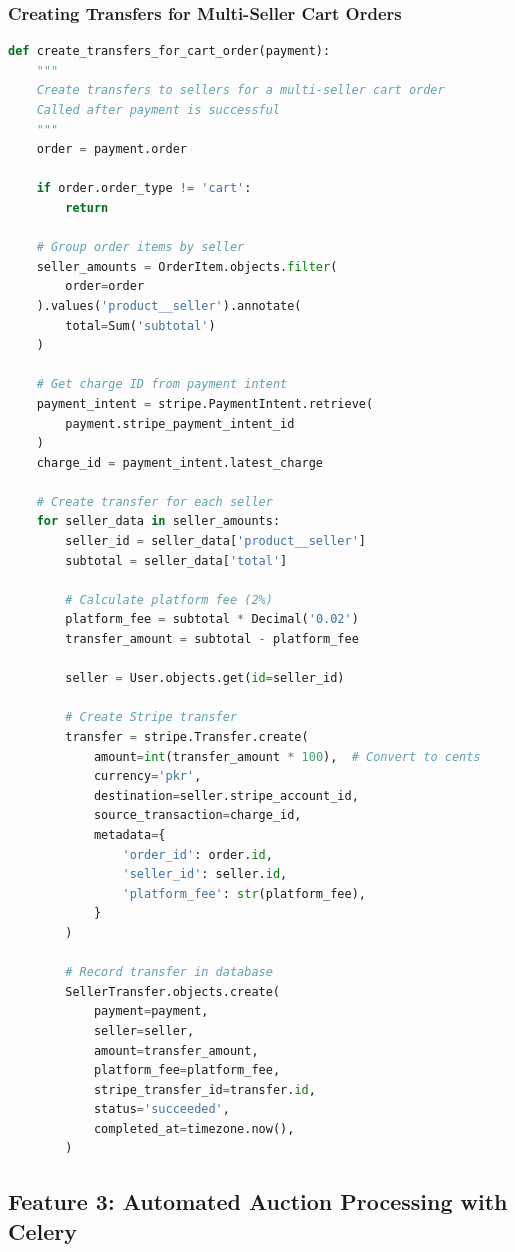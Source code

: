 \documentclass[12pt,a4paper]{article}
\begin{document}
\subsubsection{Creating Transfers for Multi-Seller Cart Orders}
\begin{lstlisting}[language=Python, caption={Automated Seller Transfers (api/stripe\_utils.py)}]
def create_transfers_for_cart_order(payment):
    """
    Create transfers to sellers for a multi-seller cart order
    Called after payment is successful
    """
    order = payment.order
    
    if order.order_type != 'cart':
        return
    
    # Group order items by seller
    seller_amounts = OrderItem.objects.filter(
        order=order
    ).values('product__seller').annotate(
        total=Sum('subtotal')
    )
    
    # Get charge ID from payment intent
    payment_intent = stripe.PaymentIntent.retrieve(
        payment.stripe_payment_intent_id
    )
    charge_id = payment_intent.latest_charge
    
    # Create transfer for each seller
    for seller_data in seller_amounts:
        seller_id = seller_data['product__seller']
        subtotal = seller_data['total']
        
        # Calculate platform fee (2%)
        platform_fee = subtotal * Decimal('0.02')
        transfer_amount = subtotal - platform_fee
        
        seller = User.objects.get(id=seller_id)
        
        # Create Stripe transfer
        transfer = stripe.Transfer.create(
            amount=int(transfer_amount * 100),  # Convert to cents
            currency='pkr',
            destination=seller.stripe_account_id,
            source_transaction=charge_id,
            metadata={
                'order_id': order.id,
                'seller_id': seller.id,
                'platform_fee': str(platform_fee),
            }
        )
        
        # Record transfer in database
        SellerTransfer.objects.create(
            payment=payment,
            seller=seller,
            amount=transfer_amount,
            platform_fee=platform_fee,
            stripe_transfer_id=transfer.id,
            status='succeeded',
            completed_at=timezone.now(),
        )
\end{lstlisting}

\subsection{Feature 3: Automated Auction Processing with Celery}
\end{document}
